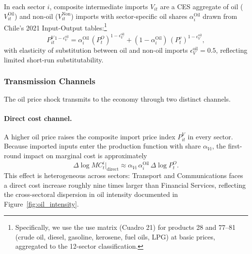 In each sector $i$, composite intermediate imports $V_{it}$ are a CES aggregate of oil ($V^{\text{Oil}}_{it}$) and non-oil ($V^{\text{Non}}_{it}$) imports with sector-specific oil shares $\alpha^{\text{Oil}}_i$ drawn from Chile's 2021 Input-Output tables:\footnote{Specifically, we use the use matrix (Cuadro 21) for products 28 and 77--81 (crude oil, diesel, gasoline, kerosene, fuel oils, LPG) at basic prices, aggregated to the 12-sector classification.}
\begin{equation}
    P^{V}_{it}{}^{1-\epsilon_{V}^{\text{oil}}} = \alpha^{\text{Oil}}_i\, (P^O_t)^{1-\epsilon_{V}^{\text{oil}}} + (1-\alpha^{\text{Oil}}_i)\, (P^v_t)^{1-\epsilon_{V}^{\text{oil}}},
    \label{eq:PIV_oil}
\end{equation}
with elasticity of substitution between oil and non-oil imports $\epsilon_V^{\text{oil}} = 0.5$, reflecting limited short-run substitutability.

\subsubsection{Transmission Channels}

The oil price shock transmits to the economy through two distinct channels.

\paragraph{Direct cost channel.}
A higher oil price raises the composite import price index $P^{V}_{it}$ in every sector.
Because imported inputs enter the production function with share $\alpha_{Vi}$, the first-round impact on marginal cost is approximately
\begin{equation}
    \Delta \log MC^i_t \bigg|_{\text{direct}} \approx \alpha_{Vi}\,\alpha^{\text{Oil}}_i\,\Delta \log P^O_t.
    \label{eq:direct_mc}
\end{equation}
This effect is heterogeneous across sectors: Transport and Communications faces a direct cost increase roughly nine times larger than Financial Services, reflecting the cross-sectoral dispersion in oil intensity documented in Figure~\ref{fig:oil_intensity}.

